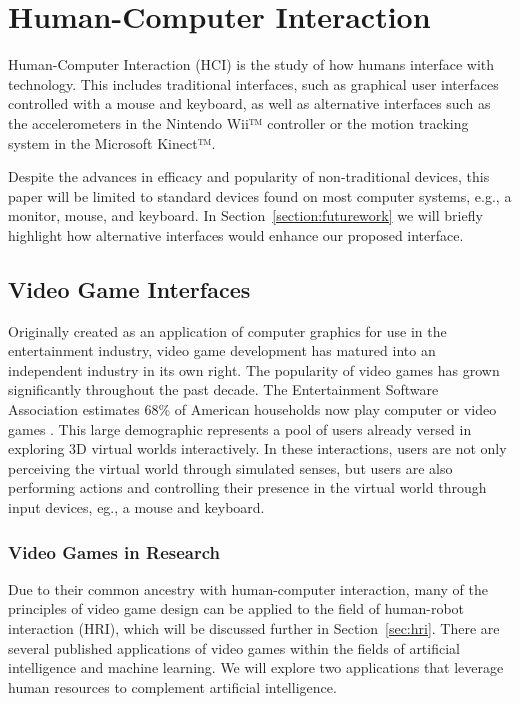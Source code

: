 \chapter{Human-Computer Interaction} %
\label{chapter:hci}
Human-Computer Interaction (HCI) is the study of how humans interface with technology. This includes traditional interfaces, such as graphical user interfaces controlled with a mouse and keyboard, as well as alternative interfaces such as the accelerometers in the Nintendo Wii™ controller or the motion tracking system in the Microsoft Kinect™.

Despite the advances in efficacy and popularity of non-traditional devices, this paper will be limited to standard devices found on most computer systems, e.g., a monitor, mouse, and keyboard. In Section~\ref{section:futurework} we will briefly highlight how alternative interfaces would enhance our proposed interface.

\section{Video Game Interfaces} %
\label{sec:video_game_interfaces}
Originally created as an application of computer graphics for use in the entertainment industry, video game development has matured into an independent industry in its own right. The popularity of video games has grown significantly throughout the past decade. The Entertainment Software Association estimates 68\% of American households now play computer or video games \cite{ESA}. This large demographic represents a pool of users already versed in exploring 3D virtual worlds interactively. In these interactions, users are not only perceiving the virtual world through simulated senses, but users are also performing actions and controlling their presence in the virtual world through input devices, eg., a mouse and keyboard.

\subsection{Video Games in Research} %
\label{sub:video_games_in_research}
Due to their common ancestry with human-computer interaction, many of the principles of video game design can be applied to the field of human-robot interaction (HRI), which will be discussed further in Section~\ref{sec:hri}. There are several published applications of video games within the fields of artificial intelligence and machine learning. We will explore two applications that leverage human resources to complement artificial intelligence.

